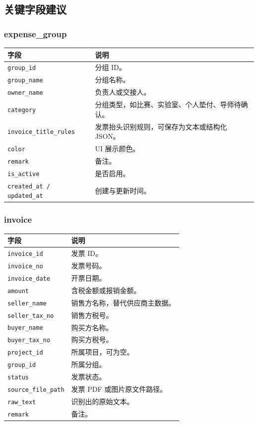\documentclass[UTF8,zihao=-4]{ctexart}
\begin{document}
\subsection{关键字段建议}

\subsubsection{expense\_group}

\begin{longtable}{p{4.2cm}p{10.2cm}}
\toprule
字段 & 说明 \\
\midrule
\texttt{group\_id} & 分组 ID。 \\
\texttt{group\_name} & 分组名称。 \\
\texttt{owner\_name} & 负责人或交接人。 \\
\texttt{category} & 分组类型，如比赛、实验室、个人垫付、导师待确认。 \\
\texttt{invoice\_title\_rules} & 发票抬头识别规则，可保存为文本或结构化 JSON。 \\
\texttt{color} & UI 展示颜色。 \\
\texttt{remark} & 备注。 \\
\texttt{is\_active} & 是否启用。 \\
\texttt{created\_at / updated\_at} & 创建与更新时间。 \\
\bottomrule
\end{longtable}

\subsubsection{invoice}

\begin{longtable}{p{4.2cm}p{10.2cm}}
\toprule
字段 & 说明 \\
\midrule
\texttt{invoice\_id} & 发票 ID。 \\
\texttt{invoice\_no} & 发票号码。 \\
\texttt{invoice\_date} & 开票日期。 \\
\texttt{amount} & 含税金额或报销金额。 \\
\texttt{seller\_name} & 销售方名称，替代供应商主数据。 \\
\texttt{seller\_tax\_no} & 销售方税号。 \\
\texttt{buyer\_name} & 购买方名称。 \\
\texttt{buyer\_tax\_no} & 购买方税号。 \\
\texttt{project\_id} & 所属项目，可为空。 \\
\texttt{group\_id} & 所属分组。 \\
\texttt{status} & 发票状态。 \\
\texttt{source\_file\_path} & 发票 PDF 或图片原文件路径。 \\
\texttt{raw\_text} & 识别出的原始文本。 \\
\texttt{remark} & 备注。 \\
\bottomrule
\end{longtable}
\end{document}
